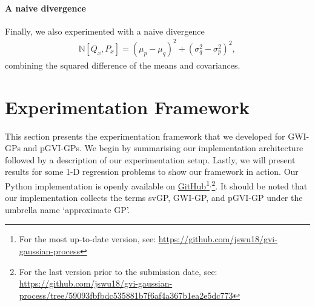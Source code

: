 \documentclass{article}
\numberwithin{equation}{section}
\begin{document}
\paragraph{A naive divergence}Finally, we also experimented with a naive divergence
\begin{align}
    \mathbb{N} \left[Q_{x}, P_{x}\right] = \left(\mu_p - \mu_q\right)^2 + \left(\sigma_q^2-\sigma_p^2\right)^2,
\end{align}
combining the squared difference of the means and covariances.

\newpage
\section{Experimentation Framework}\label{section:experimentation-framework}
This section presents the experimentation framework that we developed for GWI-GPs and pGVI-GPs.
We begin by summarising our implementation architecture followed by a description of our experimentation setup.
Lastly, we will present results for some 1-D regression problems to show our framework in action.
Our Python implementation is openly available on \href{https://github.com/jswu18/gvi-gaussian-process}{GitHub}\footnote{For the most up-to-date version, see: \href{https://github.com/jswu18/gvi-gaussian-process}{https://github.com/jswu18/gvi-gaussian-process}}$^{,}$\footnote{
For the last version prior to the submission date, see: \\\href{https://github.com/jswu18/gvi-gaussian-process/tree/59093fbfbdc535881b7f6af4a367b1ea2e5dc773}{https://github.com/jswu18/gvi-gaussian-process/tree/59093fbfbdc535881b7f6af4a367b1ea2e5dc773}}. 
It should be noted that our implementation collects the terms svGP, GWI-GP, and pGVI-GP under the umbrella name `approximate GP'.
\end{document}
